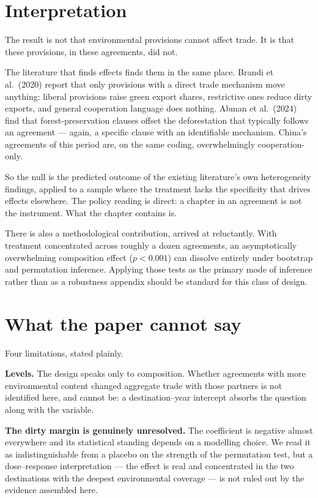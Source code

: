 \documentclass[11pt]{article}
\begin{document}
\section{Interpretation}

The result is not that environmental provisions cannot affect trade. It is that these provisions, in
these agreements, did not.

The literature that finds effects finds them in the same place. Brandi et al.\ (2020) report that
only provisions with a direct trade mechanism move anything: liberal provisions raise green export
shares, restrictive ones reduce dirty exports, and general cooperation language does nothing. Abman
et al.\ (2024) find that forest-preservation clauses offset the deforestation that typically follows
an agreement --- again, a specific clause with an identifiable mechanism. China's agreements of this
period are, on the same coding, overwhelmingly cooperation-only.

So the null is the predicted outcome of the existing literature's own heterogeneity findings, applied
to a sample where the treatment lacks the specificity that drives effects elsewhere. The policy
reading is direct: a chapter in an agreement is not the instrument. What the chapter contains is.

There is also a methodological contribution, arrived at reluctantly. With treatment concentrated
across roughly a dozen agreements, an asymptotically overwhelming composition effect ($p < 0.001$)
can dissolve entirely under bootstrap and permutation inference. Applying those tests as the primary
mode of inference rather than as a robustness appendix should be standard for this class of design.

\section{What the paper cannot say}

Four limitations, stated plainly.

\textbf{Levels.} The design speaks only to composition. Whether agreements with more environmental
content changed aggregate trade with those partners is not identified here, and cannot be: a
destination--year intercept absorbs the question along with the variable.

\textbf{The dirty margin is genuinely unresolved.} The coefficient is negative almost everywhere and
its statistical standing depends on a modelling choice. We read it as indistinguishable from a
placebo on the strength of the permutation test, but a dose--response interpretation --- the effect is
real and concentrated in the two destinations with the deepest environmental coverage --- is not ruled
out by the evidence assembled here.
\end{document}
